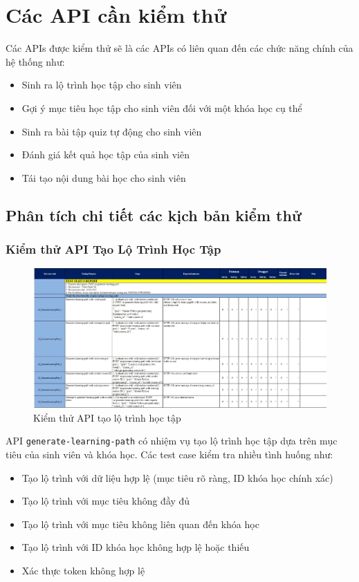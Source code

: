 \section{Các API cần kiểm thử}
Các APIs được kiểm thử sẽ là các APIs có liên quan đến các chức năng chính của hệ thống như:
\begin{itemize}
	\item Sinh ra lộ trình học tập cho sinh viên
	\item Gợi ý mục tiêu học tập cho sinh viên đối với một khóa học cụ thể
	\item Sinh ra bài tập quiz tự động cho sinh viên
	\item Đánh giá kết quả học tập của sinh viên
	\item Tái tạo nội dung bài học cho sinh viên
\end{itemize}
\subsection{Phân tích chi tiết các kịch bản kiểm thử}

\subsubsection{Kiểm thử API Tạo Lộ Trình Học Tập}
\begin{figure}[H]
	\centering
	\includegraphics[width=0.8\linewidth]{images/test/test_S1G13.png}
	\caption{Kiểm thử API tạo lộ trình học tập}
	\label{fig:testing_learning_path}
\end{figure}
API \texttt{generate-learning-path} có nhiệm vụ tạo lộ trình học tập dựa trên mục tiêu của sinh viên và khóa học. Các test case kiểm tra nhiều tình huống như:
\begin{itemize}
    \item Tạo lộ trình với dữ liệu hợp lệ (mục tiêu rõ ràng, ID khóa học chính xác)
    \item Tạo lộ trình với mục tiêu không đầy đủ
    \item Tạo lộ trình với mục tiêu không liên quan đến khóa học
    \item Tạo lộ trình với ID khóa học không hợp lệ hoặc thiếu
    \item Xác thực token không hợp lệ
\end{itemize}

